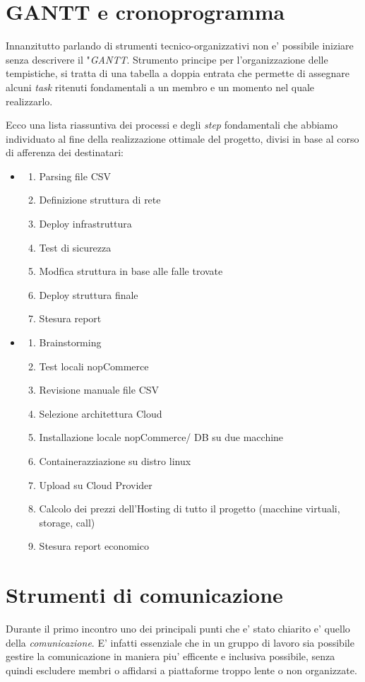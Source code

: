 \documentclass[a4paper]{report}
\begin{document}
	\section{GANTT e cronoprogramma}
	Innanzitutto parlando di strumenti tecnico-organizzativi non e' possibile iniziare senza descrivere il
	"\emph{GANTT}.  Strumento principe per l'organizzazione delle tempistiche, si tratta di una tabella a doppia entrata
	che permette di assegnare alcuni \emph{task} ritenuti fondamentali a un membro e un momento nel quale realizzarlo.

	Ecco una lista riassuntiva dei processi e degli \emph{step} fondamentali che abbiamo individuato al fine della
	realizzazione ottimale del progetto, divisi in base al corso di afferenza dei destinatari:
	\begin{itemize}
		\item \begin{enumerate}
				\item Parsing file CSV
				\item Definizione struttura di rete
				\item Deploy infrastruttura
				\item Test di sicurezza
				\item Modfica struttura in base alle falle trovate
				\item Deploy struttura finale
				\item Stesura report
			\end{enumerate}
		\item \begin{enumerate}
				\item Brainstorming
				\item Test locali nopCommerce
				\item Revisione manuale file CSV
				\item Selezione architettura Cloud
				\item Installazione locale nopCommerce/ DB su due macchine
				\item Containerazziazione su distro linux
				\item Upload su Cloud Provider 
				\item Calcolo dei prezzi dell'Hosting di tutto il progetto (macchine virtuali, storage, call)
				\item Stesura report economico
			\end{enumerate}
	\end{itemize}
	\section{Strumenti di comunicazione}
		Durante il primo incontro uno dei principali punti che e' stato chiarito e' quello della \emph{comunicazione}.
		E' infatti essenziale che in un gruppo di lavoro sia possibile gestire la comunicazione in maniera piu'
		efficente e inclusiva possibile, senza quindi escludere membri o affidarsi a piattaforme troppo lente o non
		organizzate.
		
\end{document}
